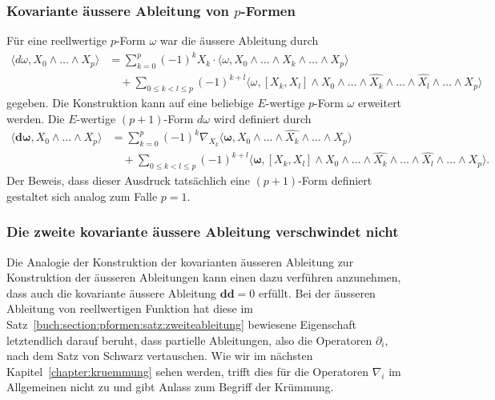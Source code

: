 %
%
\subsubsection{Kovariante äussere Ableitung von $p$-Formen}
Für eine reellwertige $p$-Form $\omega$ war die äussere Ableitung
durch
\begin{align*}
\langle d\omega,X_0\wedge\dots\wedge X_p\rangle
&=
\sum_{k=0}^p
(-1)^k
X_k\cdot\langle \omega,X_0\wedge\dots\wedge \widehat{X_k}\wedge\dots\wedge X_p\rangle
\\
&\quad+
\sum_{0\le k<l\le p}
(-1)^{k+l}\langle\omega,
[X_k,X_l]\wedge X_0\wedge\dots\wedge\widehat{X_k}\wedge\dots\wedge\widehat{X_l}\wedge\dots\wedge X_p\rangle
\end{align*}
gegeben.
Die Konstruktion kann auf eine beliebige $E$-wertige $p$-Form $\omega$
erweitert werden.
Die $E$-wertige $(p+1)$-Form $d\omega$ wird definiert durch
\begin{align*}
\langle \boldsymbol{d}\boldsymbol{\omega}, X_0\wedge\dots\wedge X_{p}\rangle
&=
\sum_{k=0}^p
(-1)^k\nabla_{X_k}\langle\boldsymbol{\omega},X_0\wedge\dots\wedge\widehat{X_k}\wedge\dots\wedge X_p)
\\
&\quad+
\sum_{0\le k < l\le p}(-1)^{k+l}
\langle \boldsymbol{\omega},
[X_k,X_l]\wedge X_0\wedge\dots\wedge\widehat{X_k}\wedge\dots\wedge\widehat{X_l}\wedge\dots\wedge X_p\rangle.
\end{align*}
Der Beweis, dass dieser Ausdruck tatsächlich eine $(p+1)$-Form definiert
gestaltet sich analog zum Falle $p=1$.

%
%
\subsubsection{Die zweite kovariante äussere Ableitung verschwindet nicht}
Die Analogie der Konstruktion der kovarianten äusseren Ableitung
zur Konstruktion der äusseren Ableitungen kann einen dazu verführen
anzunehmen, dass auch die kovariante äussere Ableitung
$\boldsymbol{d} \boldsymbol{d}=0$ erfüllt.
Bei der äusseren Ableitung von reellwertigen Funktion hat diese
im Satz~\ref{buch:section:pformen:satz:zweiteableitung} bewiesene
Eigenschaft letztendlich darauf beruht, dass partielle Ableitungen,
also die Operatoren $\partial_i$, nach dem Satz von Schwarz vertauschen.
Wie wir im nächsten Kapitel~\ref{chapter:kruemmung} sehen werden, trifft
dies für die Operatoren $\nabla_i$ im Allgemeinen nicht zu und gibt
Anlass zum Begriff der Krümmung.



